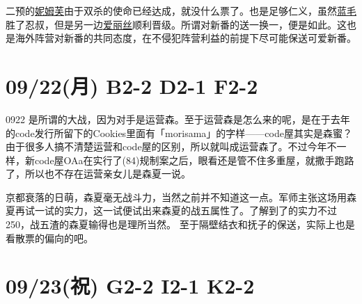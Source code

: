 二预的\uline{妮姆芙}由于双杀的使命已经达成，就没什么票了。也是足够仁义，虽然\uline{蓝毛}胜了忍叔，但是另一边\uline{爱丽丝}顺利晋级。所谓对新番的送一换一，便是如此。这也是海外阵营对新番的共同态度，在不侵犯阵营利益的前提下尽可能保送可爱新番。

\section{09/22(月) B2-2 D2-1 F2-2}


0922 是所谓的大战，因为对手是运营森。至于运营森是怎么来的呢，是在于去年的code发行所留下的Cookies里面有「morisama」的字样——code屋其实是森蜜？由于很多人搞不清楚运营和code屋的区别，所以就叫成运营森了。不过今年不一样，新code屋OAa在实行了(84)规制案之后，眼看还是管不住多重屋，就撒手跑路了，所以也不存在运营亲女儿是森夏一说。

京都衰落的日萌，森夏毫无战斗力，当然之前并不知道这一点。军师主张这场用森夏再试一试的实力，这一试便试出来森夏的战五属性了。了解到了的实力不过250，战五渣的森夏输得也是理所当然。
至于隔壁结衣和抚子的保送，实际上也是看散票的偏向的吧。

\section{09/23(祝) G2-2 I2-1 K2-2}


